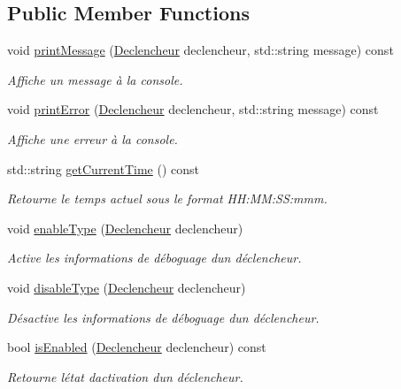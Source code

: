\subsection*{Public Member Functions}
\begin{DoxyCompactItemize}
\item 
void \hyperlink{group__inf2990_gace1a61ceaedf36808dc3ba572946eeae}{print\+Message} (\hyperlink{class_debug_afd6ed3c50c08d0a7830cd5253b4ab8b6}{Declencheur} declencheur, std\+::string message) const 
\begin{DoxyCompactList}\small\item\em Affiche un message à la console. \end{DoxyCompactList}\item 
void \hyperlink{group__inf2990_gaa53736bd47a1b811e8a51f4dc6a0ca71}{print\+Error} (\hyperlink{class_debug_afd6ed3c50c08d0a7830cd5253b4ab8b6}{Declencheur} declencheur, std\+::string message) const 
\begin{DoxyCompactList}\small\item\em Affiche une erreur à la console. \end{DoxyCompactList}\item 
std\+::string \hyperlink{group__inf2990_ga5477af77bd204e98e7aa142f992b9bd2}{get\+Current\+Time} () const 
\begin{DoxyCompactList}\small\item\em Retourne le temps actuel sous le format H\+H\+:\+M\+M\+:\+S\+S\+:mmm. \end{DoxyCompactList}\item 
void \hyperlink{group__inf2990_ga55375c6c14be967ed7f25eed578a6265}{enable\+Type} (\hyperlink{class_debug_afd6ed3c50c08d0a7830cd5253b4ab8b6}{Declencheur} declencheur)
\begin{DoxyCompactList}\small\item\em Active les informations de déboguage d\textquotesingle{}un déclencheur. \end{DoxyCompactList}\item 
void \hyperlink{group__inf2990_gaefa863abf2c2b3c6c741b88b3f78e8b3}{disable\+Type} (\hyperlink{class_debug_afd6ed3c50c08d0a7830cd5253b4ab8b6}{Declencheur} declencheur)
\begin{DoxyCompactList}\small\item\em Désactive les informations de déboguage d\textquotesingle{}un déclencheur. \end{DoxyCompactList}\item 
bool \hyperlink{group__inf2990_ga9a0c9b57363626ebb564cf07ad07fd06}{is\+Enabled} (\hyperlink{class_debug_afd6ed3c50c08d0a7830cd5253b4ab8b6}{Declencheur} declencheur) const 
\begin{DoxyCompactList}\small\item\em Retourne l\textquotesingle{}état d\textquotesingle{}activation d\textquotesingle{}un déclencheur. \end{DoxyCompactList}\end{DoxyCompactItemize}
